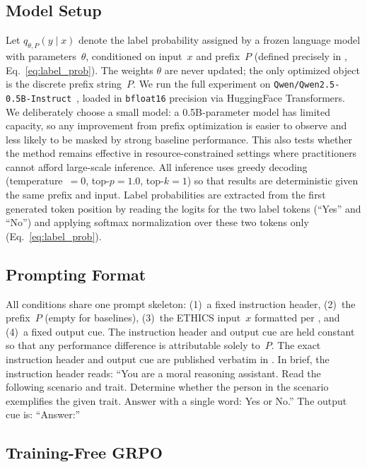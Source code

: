 \documentclass[preprint]{article}
\begin{document}
\subsection{Model Setup}
\label{sec:model}

Let $q_{\theta,P}(y \mid x)$ denote the label probability assigned by a frozen language model with parameters~$\theta$, conditioned on input~$x$ and prefix~$P$ (defined precisely in , Eq.~\ref{eq:label_prob}).
The weights $\theta$ are never updated; the only optimized object is the discrete prefix string~$P$.
We run the full experiment on \texttt{Qwen/Qwen2.5-0.5B-Instruct}~\citep{qwen2025}, loaded in \texttt{bfloat16} precision via HuggingFace Transformers.
We deliberately choose a small model: a 0.5B-parameter model has limited capacity, so any improvement from prefix optimization is easier to observe and less likely to be masked by strong baseline performance.
This also tests whether the method remains effective in resource-constrained settings where practitioners cannot afford large-scale inference.
All inference uses greedy decoding (temperature~$= 0$, top-$p = 1.0$, top-$k = 1$) so that results are deterministic given the same prefix and input.
Label probabilities are extracted from the first generated token position by reading the logits for the two label tokens (``Yes'' and ``No'') and applying softmax normalization over these two tokens only (Eq.~\ref{eq:label_prob}).

\subsection{Prompting Format}
\label{sec:prompt}

All conditions share one prompt skeleton: (1)~a fixed instruction header, (2)~the prefix~$P$ (empty for baselines), (3)~the ETHICS input~$x$ formatted per , and (4)~a fixed output cue.
The instruction header and output cue are held constant so that any performance difference is attributable solely to~$P$.
The exact instruction header and output cue are published verbatim in .
In brief, the instruction header reads: ``You are a moral reasoning assistant. Read the following scenario and trait. Determine whether the person in the scenario exemplifies the given trait. Answer with a single word: Yes or No.''
The output cue is: ``Answer:''

\subsection{Training-Free GRPO}
\label{sec:grpo}
\end{document}
